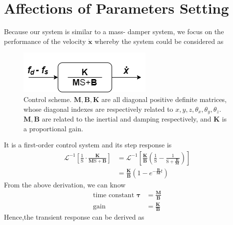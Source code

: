 \section{Affections of Parameters Setting}
\label{sec:affection}
\hspace*{6mm}Because our system is similar to a mass- damper system, we focus on the performance of the velocity $\boldsymbol{\dot{x}}$ whereby the system could be considered as
\begin{figure}[htbp]
\begin{center}
\includegraphics[width=0.6\linewidth]{Images/mass spring.png}
\hspace*{6mm}\end{center}
\caption{
Control scheme. $\mathbf{M},\mathbf{B},\mathbf{K}$ are all diagonal positive definite matrices, whose diagonal indexes are respectively related to $x,y,z,\theta_x,\theta_y,\theta_z$. $\mathbf{M},\mathbf{B}$ are related to the inertial and damping respectively, and $\mathbf{K}$ is a proportional gain. 
}\label{fig:mass spring}
\end{figure}
\par\noindent
It is a first-order control system and its step response is 
\begin{equation}
\begin{split}
\mathcal{L}^{-1} \left[ \frac{1}{\mathrm{S}} \cdot \frac{\mathbf{K}}{\mathbf{M}\mathrm{S}+\mathbf{B}} \right] 
&= \mathcal{L}^{-1} \left[ \frac{\mathbf{K}}{\mathbf{B}} \left( \frac{1}{\mathrm{S}} - \frac{1}{\mathrm{S}+\frac{\mathbf{B}}{\mathbf{M}}} \right) \right] \\
&= \frac{\mathbf{K}}{\mathbf{B}} \left(1 - e^{- \frac{\mathbf{B}}{\mathbf{M}} t}  \right)
\end{split}
\end{equation}
From the above derivation, we can know 
\begin{equation}
\begin{split}
\text{time constant } \boldsymbol{\tau} &= \frac{\mathbf{M}}{\mathbf{B}}\\
\text{gain} &= \frac{\mathbf{K}}{\mathbf{B}}
\end{split}
\end{equation}
Hence,the transient response can be derived as 
